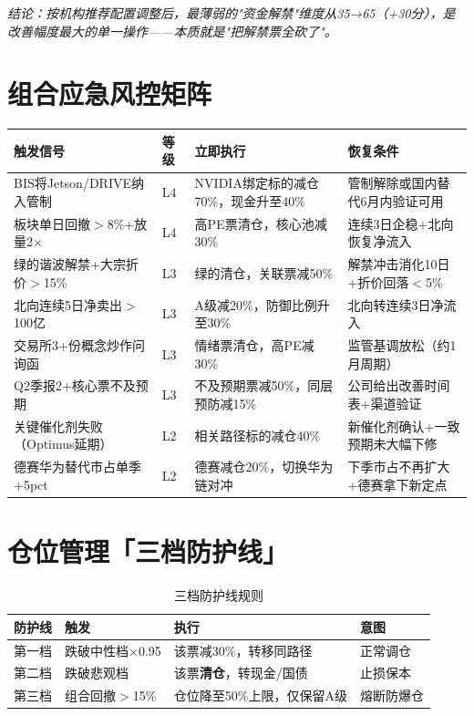 \textit{结论：按机构推荐配置调整后，最薄弱的"资金解禁"维度从35→65（+30分），是改善幅度最大的单一操作——本质就是"把解禁票全砍了"。}

\section{组合应急风控矩阵}

\begin{riskbox}[触发信号与应急动作]
\scriptsize
\begin{tabularx}{\textwidth}{X l X X}
\toprule
\textbf{触发信号} & \textbf{等级} & \textbf{立即执行} & \textbf{恢复条件} \\
\midrule
BIS将Jetson/DRIVE纳入管制 & L4 & NVIDIA绑定标的减仓70\%，现金升至40\% & 管制解除或国内替代6月内验证可用 \\
板块单日回撤$>$8\%+放量2$\times$ & L4 & 高PE票清仓，核心池减30\% & 连续3日企稳+北向恢复净流入 \\
绿的谐波解禁+大宗折价$>$15\% & L3 & 绿的清仓，关联票减50\% & 解禁冲击消化10日+折价回落$<$5\% \\
北向连续5日净卖出$>$100亿 & L3 & A级减20\%，防御比例升至30\% & 北向转连续3日净流入 \\
交易所3+份概念炒作问询函 & L3 & 情绪票清仓，高PE减30\% & 监管基调放松（约1月周期） \\
Q2季报2+核心票不及预期 & L3 & 不及预期票减50\%，同层预防减15\% & 公司给出改善时间表+渠道验证 \\
关键催化剂失败（Optimus延期） & L2 & 相关路径标的减仓40\% & 新催化剂确认+一致预期未大幅下修 \\
德赛华为替代市占单季+5pct & L2 & 德赛减仓20\%，切换华为链对冲 & 下季市占不再扩大+德赛拿下新定点 \\
\bottomrule
\end{tabularx}
\end{riskbox}

\section{仓位管理「三档防护线」}

\begin{table}[H]
\centering\small
\renewcommand{\arraystretch}{1.3}
\begin{tabularx}{\textwidth}{l l X l}
\toprule
\textbf{防护线} & \textbf{触发} & \textbf{执行} & \textbf{意图} \\
\midrule
\textcolor{riskgreen}{第一档} & 跌破中性档$\times$0.95 & 该票减30\%，转移同路径 & 正常调仓 \\
\textcolor{riskamber}{第二档} & 跌破悲观档 & 该票\textbf{清仓}，转现金/国债 & 止损保本 \\
\textcolor{riskred}{第三档} & 组合回撤$>$15\% & 仓位降至50\%上限，仅保留A级 & 熔断防爆仓 \\
\bottomrule
\end{tabularx}
\caption{三档防护线规则}
\end{table}


